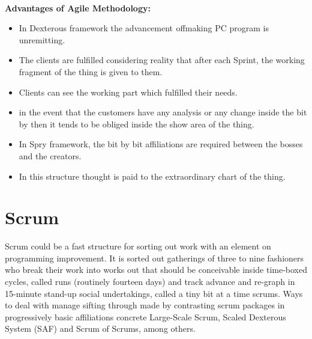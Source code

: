 \documentclass[oneside,12pt]{Classes/VTU}
\begin{document}
    	\paragraph{}
    	\textbf{Advantages of Agile Methodology:}
    	\begin{itemize}
    		\item In Dexterous framework the advancement\tiny\textcolor{white}{s}\normalsize of\tiny\textcolor{white}{f}\normalsize making PC program is unremitting. 
    		\item The clients are fulfilled considering reality that after each Sprint, the working fragment of the thing is given to them.
    		\item Clients can see the working part which fulfilled their needs. 
    		\item in the event that the customers have any analysis or any change inside the bit by then it tends to be obliged inside the show area of the thing. 
    		\item In Spry framework, the bit by bit affiliations are required between the bosses and the creators. 
    		\item In this structure thought is paid to the extraordinary chart of the thing.
    	\end{itemize}
    	
    	
    	
    	\section{Scrum}
    	Scrum could be a fast structure for sorting out work with an element on programming improvement. It is sorted out gatherings of three to nine fashioners who break their work into works out that should be conceivable inside time-boxed cycles, called runs (routinely fourteen days) and track advance and re-graph in 15-minute stand-up social undertakings, called a tiny bit at a time scrums. Ways to deal with manage sifting through made by contrasting scrum packages in progressively basic affiliations concrete Large-Scale Scrum, Scaled Dexterous System (SAF) and Scrum of Scrums, among others.
    	
\end{document}
